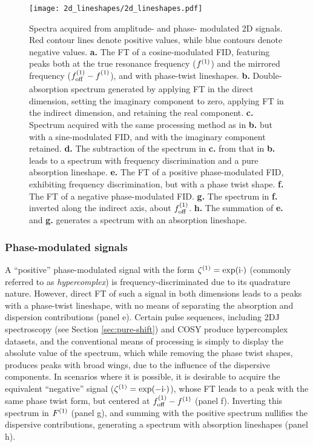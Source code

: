 \begin{figure}
    \centering
    \texttt{[image: 2d\_lineshapes/2d\_lineshapes.pdf]}
    \caption[
        Spectra acquired from amplitude- and phase-modulated \acs{2D} signals.
    ]{
        Spectra acquired from amplitude- and phase- modulated \acs{2D} signals.
        Red contour lines denote positive values, while blue contours denote
        negative values.
        \textbf{a.} The \ac{FT} of a cosine-modulated \ac{FID}, featuring peaks
        both at the true resonance frequency ($f^{(1)}$) and the mirrored
        frequency ($f_{\mathrm{off}}^{(1)} - f^{(1)}_{\vphantom{off}}$), and with phase-twist lineshapes.
        \textbf{b.} Double-absorption spectrum generated by applying \ac{FT}
        in the direct dimension, setting the imaginary component to zero,
        applying \ac{FT} in the indirect dimension, and retaining the real
        component.
        \textbf{c.} Spectrum acquired with the same processing method as in
        \textbf{b.} but with a sine-modulated \ac{FID}, and with the imaginary
        component retained.
        \textbf{d.} The subtraction of the spectrum in \textbf{c.} from that in
        \textbf{b.} leads to a spectrum with frequency discrimination and a
        pure absorption lineshape.
        \textbf{e.} The \ac{FT} of a positive phase-modulated \ac{FID},
        exhibiting frequency discrimination, but with a phase twist shape.
        \textbf{f.} The \ac{FT} of a negative phase-modulated \ac{FID}.
        \textbf{g.} The spectrum in \textbf{f.} inverted along the indirect
        axis, about $f_{\mathrm{off}}^{(1)}$.
        \textbf{h.} The summation of \textbf{e.} and \textbf{g.} generates a
        spectrum with an absorption lineshape.
    }
    \label{fig:2d-lineshapes}
\end{figure}

\subsubsection{Phase-modulated signals}

A ``positive'' phase-modulated signal with the form $\zeta^{(1)} = \exp(\mathrm{i} \cdot)$
(commonly referred to as \emph{hypercomplex}) is frequency-discriminated due to
its quadrature nature. However, direct \ac{FT} of such a signal in both
dimensions leads to a peaks with a phase-twist lineshape, with no means of
separating the absorption and dispersion contributions (panel e). Certain pulse
sequences, including \ac{2DJ} spectroscopy\cite{Aue1976,Morris2009} (see
Section \ref{sec:pure-shift}) and
\ac{COSY}\cite{Jeener1971,Jeener2016,Aue1976a} produce hypercomplex datasets,
and the conventional means of processing is simply to display the absolute
value of the spectrum, which while removing the phase twist shapes, produces
peaks with broad wings, due to the influence of the dispersive components. In
scenarios where it is possible, it is desirable to acquire the equivalent
``negative'' signal ($\zeta^{(1)} = \exp(-\mathrm{i} \cdot)$), whose \ac{FT} leads to
a peak with the same phase twist form, but centered at $f_{\mathrm{off}}^{(1)} - f^{(1)}$
(panel f). Inverting this spectrum in $F^{(1)}$ (panel g), and summing with the
positive spectrum nullifies the dispersive contributions, generating a spectrum
with absorption lineshapes\cite{Davis1992} (panel h).

